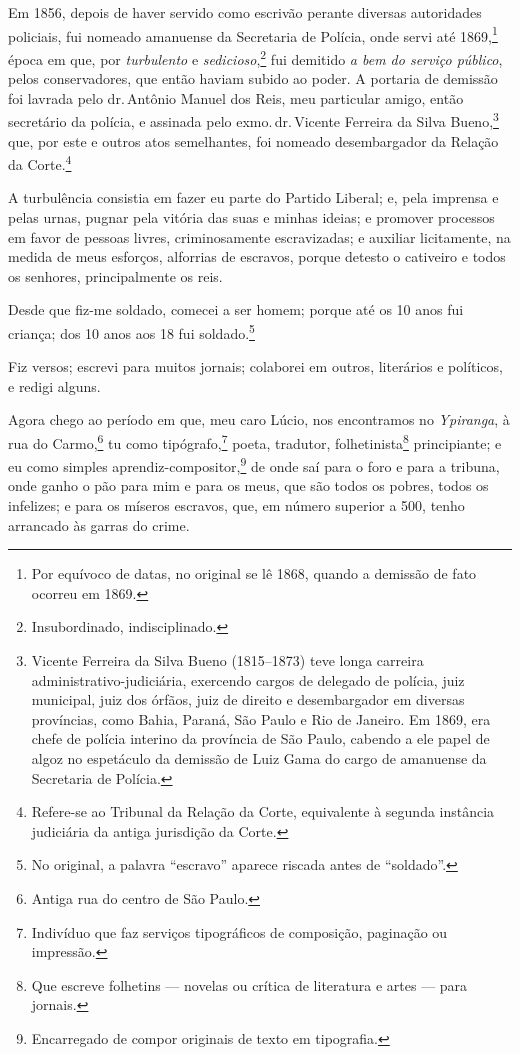 Em 1856, depois de haver servido como escrivão perante diversas
autoridades policiais, fui nomeado amanuense da Secretaria de Polícia,
onde servi até 1869,\footnote{Por equívoco de datas, no original se lê
  1868, quando a demissão de fato ocorreu em 1869.} época em que, por
\emph{turbulento} e \emph{sedicioso},\footnote{Insubordinado,
  indisciplinado.} fui demitido \emph{a bem do serviço público},
pelos conservadores, que então haviam subido ao poder. A portaria de
demissão foi lavrada pelo dr.\,Antônio Manuel dos Reis, meu particular
amigo, então secretário da polícia, e assinada pelo exmo.\,dr.\,Vicente
Ferreira da Silva Bueno,\footnote{Vicente Ferreira da Silva Bueno \label{bueno}
  (1815--1873) teve longa carreira administrativo-judiciária, exercendo
  cargos de delegado de polícia, juiz municipal, juiz dos órfãos, juiz
  de direito e desembargador em diversas províncias, como Bahia, Paraná,
  São Paulo e Rio de Janeiro. Em 1869, era chefe de polícia interino da
  província de São Paulo, cabendo a ele papel de algoz no espetáculo da
  demissão de Luiz Gama do cargo de amanuense da Secretaria de Polícia.}
que, por este e outros atos semelhantes, foi nomeado desembargador da
Relação da Corte.\footnote{Refere-se ao Tribunal da Relação da Corte,
  equivalente à segunda instância judiciária da antiga jurisdição da
  Corte.}

A turbulência consistia em fazer eu parte do Partido Liberal; e, pela
imprensa e pelas urnas, pugnar pela vitória das suas e minhas ideias; e
promover processos em favor de pessoas livres, criminosamente
escravizadas; e auxiliar licitamente, na medida de meus esforços,
alforrias de escravos, porque detesto o cativeiro e todos os senhores,
principalmente os reis.

Desde que fiz-me soldado, comecei a ser homem; porque até os 10 anos fui
criança; dos 10 anos aos 18 fui soldado.\footnote{No original, a palavra ``escravo'' aparece riscada antes de ``soldado''.}

Fiz versos; escrevi para muitos jornais; colaborei em outros, literários
e políticos, e redigi alguns.

Agora chego ao período em que, meu caro Lúcio, nos encontramos no
\emph{Ypiranga}, à rua do Carmo,\footnote{Antiga rua do centro de São
  Paulo.} tu como tipógrafo,\footnote{Indivíduo que faz serviços
  tipográficos de composição, paginação ou impressão.} poeta, tradutor,
folhetinista\footnote{Que escreve folhetins --- novelas ou crítica de
  literatura e artes --- para jornais.} principiante; e eu como simples
aprendiz-compositor,\footnote{Encarregado de compor originais de texto
  em tipografia.} de onde
saí para o foro e para a tribuna, onde ganho o pão para mim e para os
meus, que são todos os pobres, todos os infelizes; e para os míseros
escravos, que, em número superior a 500, tenho arrancado às garras do
crime.

